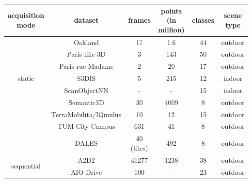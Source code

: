     \begin{table}[h!]
        \begin{tabular}{c|c|c|c|c|c}%
            \hline
            acquisition mode & dataset & frames & points (in million) & classes & scene type \\  %
            \hline
            \multirow{7}{*}{static} & Oakland\cite{oakland} & 17 & 1.6 &  44 & outdoor \\ %
                                    & Paris-lille-3D\cite{roynard2018paris} & 3 & 143 & 50 & outdoor \\ %
                                    & Paris-rue-Madame\cite{paris_rue_madame} & 2 & 20 & 17 & outdoor \\ %
                                    & S3DIS\cite{Armeni_2016_CVPR_S3DIS} & 5 & 215 & 12 & indoor \\ %
                                    & ScanObjectNN\cite{scanobejctnn} & - & - & 15 & indoor \\ %
                                    & Semantic3D\cite{hackel2017semantic3d} & 30 & 4009 & 8 & outdoor \\ %
                                    & TerraMobilita/IQmulus\cite{TerraMobilita} & 10 & 12 & 15 & outdoor\\ %
                                    & TUM City Campus\cite{gehrung2017approach_tum_campus} & 631 & 41 & 8 & outdoor\\ %
                                    & DALES\cite{varney2020dales} & 40 (tiles) & 492 & 8 & outdoor\\ %
            \hline
            \multirow{7}{*}{sequential} & A2D2\cite{geyer2020a2d2} & 41277 & 1238 & 38 & outdoor\\ %
                                        & AIO Drive\cite{Weng2020_AIODrive} & 100& - & 23 & outdoor\\ %

\end{tabular}
\end{table}
